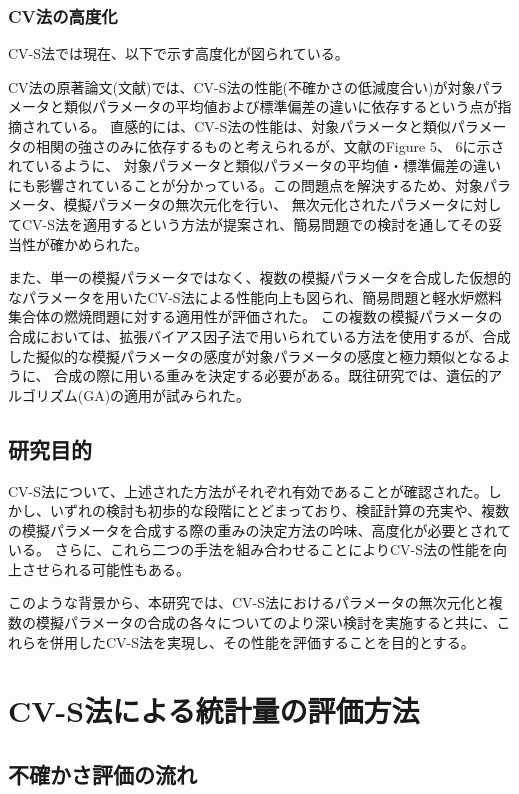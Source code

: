 \documentclass[a4paper,11pt,titlepage,uplatex]{jsreport}
\begin{document}
\subsection{CV法の高度化}
CV-S法では現在、以下で示す高度化が図られている。

CV法の原著論文(文献\cite{nihira2019combination})では、CV-S法の性能(不確かさの低減度合い)が対象パラメータと類似パラメータの平均値および標準偏差の違いに依存するという点が指摘されている。
直感的には、CV-S法の性能は、対象パラメータと類似パラメータの相関の強さのみに依存するものと考えられるが、文献\cite{nihira2019combination}のFigure 5、 6に示されているように、
対象パラメータと類似パラメータの平均値・標準偏差の違いにも影響されていることが分かっている。この問題点を解決するため、対象パラメータ、模擬パラメータの無次元化を行い、
無次元化されたパラメータに対してCV-S法を適用するという方法が提案され、簡易問題での検討を通してその妥当性が確かめられた\cite{suzuki2022}。

また、単一の模擬パラメータではなく、複数の模擬パラメータを合成した仮想的なパラメータを用いたCV-S法による性能向上も図られ、簡易問題と軽水炉燃料集合体の燃焼問題に対する適用性が評価された\cite{kida2022aki}\cite{kida2022syuusi}。
この複数の模擬パラメータの合成においては、拡張バイアス因子法で用いられている方法\cite{kugo2007theoretical}を使用するが、合成した擬似的な模擬パラメータの感度が対象パラメータの感度と極力類似となるように、
合成の際に用いる重みを決定する必要がある。既往研究では、遺伝的アルゴリズム(GA)の適用が試みられた\cite{kida2022aki}。

\section{研究目的}
CV-S法について、上述された方法がそれぞれ有効であることが確認された。しかし、いずれの検討も初歩的な段階にとどまっており、検証計算の充実や、複数の模擬パラメータを合成する際の重みの決定方法の吟味、高度化が必要とされている。
さらに、これら二つの手法を組み合わせることによりCV-S法の性能を向上させられる可能性もある。

このような背景から、本研究では、CV-S法におけるパラメータの無次元化と複数の模擬パラメータの合成の各々についてのより深い検討を実施すると共に、これらを併用したCV-S法を実現し、その性能を評価することを目的とする。
\newpage

\chapter{CV-S法による統計量の評価方法}
\section{不確かさ評価の流れ}
\end{document}
